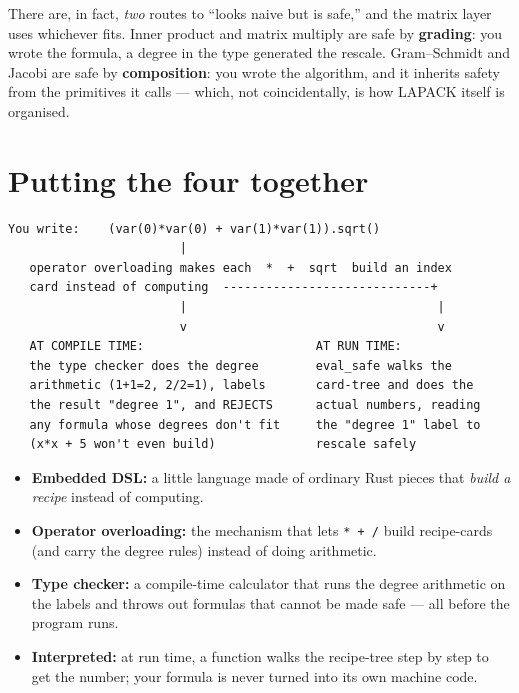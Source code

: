 \documentclass[11pt]{article}
\newcommand{\code}[1]{\texttt{#1}}
\begin{document}
There are, in fact, \emph{two} routes to ``looks naive but is safe,'' and the
matrix layer uses whichever fits. Inner product and matrix multiply are safe
by \textbf{grading}: you wrote the formula, a degree in the type generated the
rescale. Gram--Schmidt and Jacobi are safe by \textbf{composition}: you wrote
the algorithm, and it inherits safety from the primitives it calls --- which,
not coincidentally, is how LAPACK itself is organised.

\section{Putting the four together}

\begin{center}
\begin{BVerbatim}
You write:    (var(0)*var(0) + var(1)*var(1)).sqrt()
                        |
   operator overloading makes each  *  +  sqrt  build an index
   card instead of computing  -----------------------------+
                        |                                   |
                        v                                   v
   AT COMPILE TIME:                        AT RUN TIME:
   the type checker does the degree        eval_safe walks the
   arithmetic (1+1=2, 2/2=1), labels       card-tree and does the
   the result "degree 1", and REJECTS      actual numbers, reading
   any formula whose degrees don't fit     the "degree 1" label to
   (x*x + 5 won't even build)              rescale safely
\end{BVerbatim}
\end{center}

\begin{itemize}[leftmargin=1.4em]
  \item \textbf{Embedded DSL:} a little language made of ordinary Rust pieces
  that \emph{build a recipe} instead of computing.
  \item \textbf{Operator overloading:} the mechanism that lets \code{* + /} build
  recipe-cards (and carry the degree rules) instead of doing arithmetic.
  \item \textbf{Type checker:} a compile-time calculator that runs the degree
  arithmetic on the labels and throws out formulas that cannot be made safe ---
  all before the program runs.
  \item \textbf{Interpreted:} at run time, a function walks the recipe-tree step
  by step to get the number; your formula is never turned into its own machine
  code.
\end{itemize}
\end{document}
